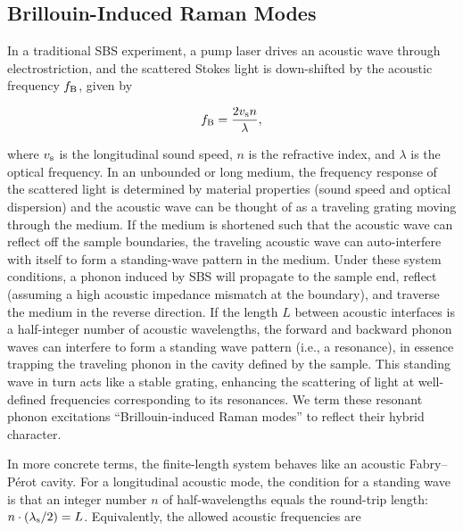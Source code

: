 \subsection{Brillouin-Induced Raman Modes}
\label{subsec:Raman:Brillouin-InducedRamanModes}

In a traditional SBS experiment, a pump laser drives an acoustic wave through electrostriction, and the scattered Stokes light is down-shifted by the acoustic frequency \(f_{\rm B}\), given by \cite{boyd2020nonlinear}

\begin{equation}
  f_{\rm B} = \frac{2v_{\rm s}n}{\lambda},
  \label{eq:Raman:f_B}
\end{equation}

where \(v_{\rm s}\) is the longitudinal sound speed, \(n\) is the refractive index, and \(\lambda\) is the optical frequency. In an unbounded or long medium, the frequency response of the scattered light is determined by material properties (sound speed and optical dispersion) and the acoustic wave can be thought of as a traveling grating moving through the medium. If the medium is shortened such that the acoustic wave can reflect off the sample boundaries, the traveling acoustic wave can auto-interfere with itself to form a standing-wave pattern in the medium. Under these system conditions, a phonon induced by \ac{SBS} will propagate to the sample end, reflect (assuming a high acoustic impedance mismatch at the boundary), and traverse the medium in the reverse direction. If the length \(L\) between acoustic interfaces is a half-integer number of acoustic wavelengths, the forward and backward phonon waves can interfere to form a standing wave pattern (i.e., a resonance), in essence trapping the traveling phonon in the cavity defined by the sample. This standing wave in turn acts like a stable grating, enhancing the scattering of light at well-defined frequencies corresponding to its resonances. We term these resonant phonon excitations “Brillouin-induced Raman modes” to reflect their hybrid character.

In more concrete terms, the finite-length system behaves like an acoustic Fabry–Pérot cavity. For a longitudinal acoustic mode, the condition for a standing wave is that an integer number \(n\) of half-wavelengths equals the round-trip length: \(n \cdot (\lambda_{\rm s}/2) = L\). Equivalently, the allowed acoustic frequencies are

